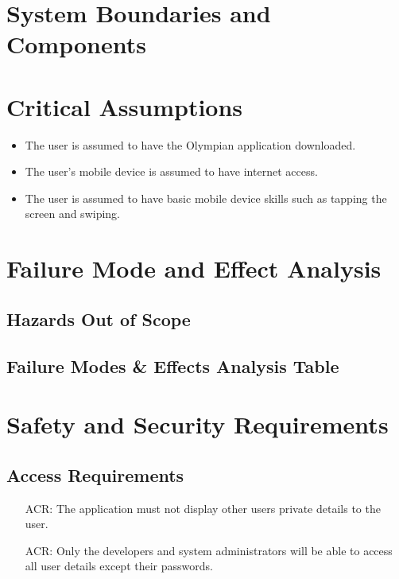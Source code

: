 \documentclass{article}
\newcounter{ACRnum}
\begin{document}
	\section{System Boundaries and Components}
	
	\section{Critical Assumptions}

	\begin{itemize}

	\item The user is assumed to have the Olympian application downloaded.

	\item The user's mobile device is assumed to have internet access.

	\item The user is assumed to have basic mobile device skills such as tapping the screen and swiping.
		
	\end{itemize}

	
	\section{Failure Mode and Effect Analysis}
	\subsection{Hazards Out of Scope}
	\subsection{Failure Modes \& Effects Analysis Table}
	
	\section{Safety and Security Requirements}
	
	
	\subsection{Access Requirements}
	\noindent 
	\begin{itemize}
		\item[ACR\refstepcounter{ACRnum}\theACRnum:]
		The application must not display other users private details to the user.
		\item[ACR\refstepcounter{ACRnum}\theACRnum:]
		Only the developers and system administrators will be able to access all user details except their passwords.
	\end{itemize}
\end{document}
